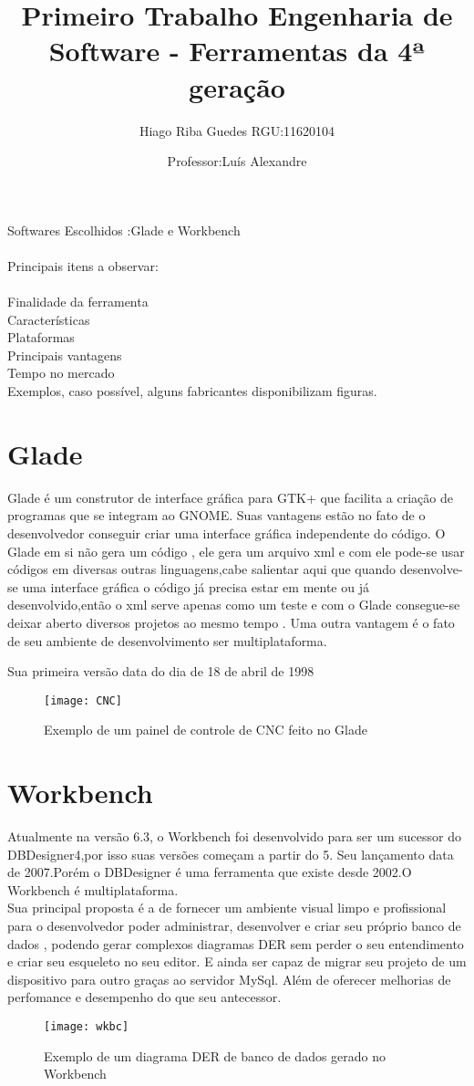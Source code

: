 \documentclass[11pt,a4paper]{article}
\title{Primeiro Trabalho Engenharia de Software - Ferramentas da 4ª geração}
\author{Hiago Riba Guedes RGU:11620104}
\date{Professor:Luís Alexandre}
\begin{document}
\maketitle
Softwares Escolhidos :Glade e Workbench\\\\
Principais itens a observar:\\\\
Finalidade da ferramenta\\
Características\\
Plataformas\\
Principais vantagens\\
Tempo no mercado\\
Exemplos, caso possível, alguns fabricantes disponibilizam figuras.

\section*{Glade}
Glade é um construtor de interface gráfica para GTK+ que facilita a criação de programas que se integram ao GNOME. Suas vantagens estão no fato de o desenvolvedor conseguir criar uma interface gráfica independente do código. O Glade em si não gera um código , ele gera um arquivo xml e com ele pode-se usar códigos em diversas outras linguagens,cabe salientar aqui que quando desenvolve-se uma interface gráfica o código já precisa estar em mente ou já desenvolvido,então o xml serve apenas como um teste e com o Glade consegue-se deixar aberto diversos projetos ao mesmo tempo . Uma outra vantagem é o fato de seu ambiente de desenvolvimento ser multiplataforma. 

Sua primeira versão data do dia de 18 de abril de 1998
\begin{figure}[!h]
\begin{center}
\texttt{[image: CNC]}
\caption{Exemplo de um painel de controle de CNC feito no Glade}
\end{center}
\end{figure}

\section*{Workbench}
Atualmente na versão 6.3, o Workbench foi desenvolvido para ser um sucessor do DBDesigner4,por isso suas versões começam a partir do 5. Seu lançamento data de 2007.Porém o DBDesigner é uma ferramenta que existe desde 2002.O Workbench é multiplataforma. \\
Sua principal proposta é a de fornecer um ambiente visual limpo e profissional para o desenvolvedor poder administrar, desenvolver e criar seu próprio banco de dados , podendo gerar complexos diagramas DER sem perder o seu entendimento e criar seu esqueleto no seu editor. E ainda ser capaz de migrar seu projeto de um dispositivo para outro graças ao servidor MySql. Além de oferecer melhorias de perfomance e desempenho do que seu antecessor.
\begin{figure}[!h]
\begin{center}
\texttt{[image: wkbc]}
\caption{Exemplo de um diagrama DER de banco de dados gerado no Workbench}
\end{center}
\end{figure}
\end{document}
